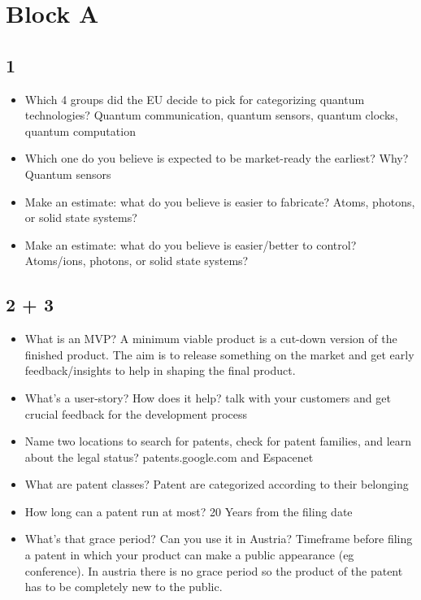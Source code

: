 \documentclass{alex_summary}
\begin{document}
	\section{Block A}
	\subsection*{1}
	\begin{itemize}
		\item Which 4 groups did the EU decide to pick for categorizing quantum technologies?
		Quantum communication, quantum sensors, quantum clocks, quantum computation
		\item Which one do you believe is expected to be market-ready the earliest? Why?
		Quantum sensors
		\item Make an estimate: what do you believe is easier to fabricate? Atoms, photons, or solid state systems?
		\item Make an estimate: what do you believe is easier/better to control? Atoms/ions, photons, or solid state systems?
	\end{itemize}
		
	\subsection*{2 + 3}
	\begin{itemize}
		\item What is an MVP?
		A minimum viable product is a cut-down version of the finished product. The aim is to release something on the market and get early feedback/insights to help in shaping the final product.
		\item What’s a user-story? How does it help?
		talk with your customers and get crucial feedback for the development process
		\item Name two locations to search for patents, check for patent families, and learn about the legal status?
		patents.google.com and Espacenet
		\item What are patent classes?
		Patent are categorized according to their belonging
		\item How long can a patent run at most?
		20 Years from the filing date
		\item What’s that grace period? Can you use it in Austria?
		Timeframe before filing a patent in which your product can make a public appearance (eg conference). In austria there is no grace period so the product of the patent has to be completely new to the public.
	\end{itemize}
	
\end{document}
